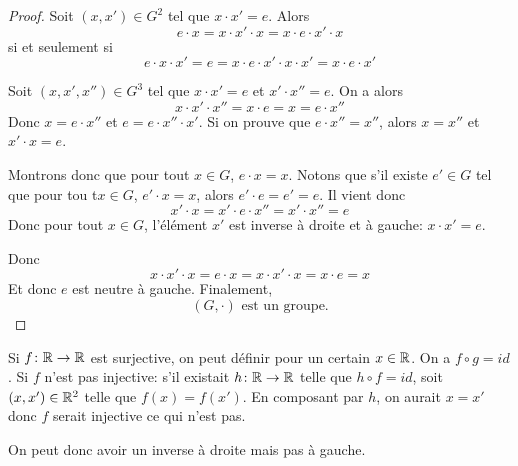 \documentclass[12pt]{article}
\begin{document}
\begin{proof}
	Soit $(x,x')\in G^{2}$ tel que $x\cdot x'=e$. Alors 
	\begin{equation}
		e\cdot x=x\cdot x'\cdot x =x\cdot e\cdot x'\cdot x
	\end{equation}
	si et seulement si 
	\begin{equation}
		e\cdot x\cdot x'=e=x\cdot e\cdot x'\cdot x\cdot x'=x\cdot e \cdot	x'
	\end{equation}

	Soit $(x,x',x'')\in G^{3}$ tel que $x\cdot x'=e$ et $x'\cdot x''=e$. On a alors 
	\begin{equation}
		x\cdot x'\cdot x''=x\cdot e = x = e\cdot x''
	\end{equation}
	Donc $x=e\cdot x''$ et $e=e\cdot x''\cdot x'$. Si on prouve que $e\cdot x''=x''$, alors $x=x''$ et $x'\cdot x=e$.

	Montrons donc que pour tout $x\in G$, $e\cdot x=x$. Notons que s'il existe $e'\in G$ tel que pour tou t$x\in G$, $e'\cdot x=x$, alors $e'\cdot e=e'=e$.
	Il vient donc 
	\begin{equation}
		x'\cdot x=x'\cdot e\cdot x''=x'\cdot x''=e
	\end{equation}
	Donc pour tout $x\in G$, l'élément $x'$ est inverse à droite et à gauche: $x\cdot x'=e$.

	Donc 
	\begin{equation}
		x\cdot x'\cdot x=e\cdot x =x\cdot x'\cdot x=x\cdot e=x
	\end{equation}
	Et donc $e$ est neutre à gauche. Finalement, 
	\begin{equation}
		\boxed{(G,\cdot)\text{ est un groupe.}}
	\end{equation}
\end{proof}

\begin{remark}
	Si $f\colon\mathbb{R}\to\mathbb{R}$ est surjective, on peut définir  pour un certain $x\in\mathbb{R}$. On a $f\circ g=id$. Si $f$ n'est pas injective: s'il existait $h\colon\mathbb{R}\to\mathbb{R}$ telle que $h\circ f=id$, soit $(x,x')\in \mathbb{R}^{2}$ telle que $f(x)=f(x')$. En composant par $h$, on aurait $x=x'$ donc $f$ serait injective ce qui n'est pas. 

	On peut donc avoir un inverse à droite mais pas à gauche.
\end{remark}
\end{document}
